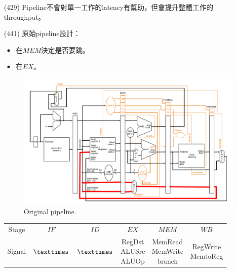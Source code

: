 \item \begin{theorem}{(429)} Pipeline不會對單一工作的latency有幫助，但會提升整體工作的throughput。
\end{theorem}

\item \begin{theorem}{(441)} 原始pipeline設計：\begin{itemize}
        \item {}在$MEM$決定是否要跳。
        \item {}在$EX$。
    \end{itemize}
    \begin{figure}[H]
        \centering
        \includegraphics[scale=0.3]{img/pipeline-org.png}
        \caption{Original pipeline.}
        \label{img:pipeline-org}
    \end{figure}
    \begin{table}[H]
        \centering
        \begin{tabular}{|c|c|c|c|c|c|}
            \hline
            Stage & $IF$ & $ID$ & $EX$ & $MEM$ & $WB$ \\
            \Xhline{2\arrayrulewidth}
            Signal & $\texttimes$ & $\texttimes$ & \makecell{RegDst\\ALUSrc\\ALUOp} & \makecell{MemRead\\MemWrite\\branch} & \makecell{RegWrite\\MemtoReg} \\
            \hline
        \end{tabular}
    \end{table}
\end{theorem}

